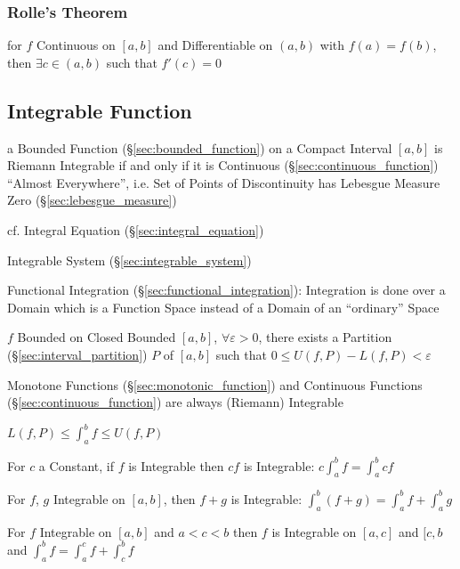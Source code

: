 \subsubsection{Rolle's Theorem}\label{sec:rolles_theorem}

for $f$ Continuous on $[a,b]$ and Differentiable on $(a,b)$ with $f(a)
= f(b)$, then $\exists c \in (a,b)$ such that $f'(c) = 0$



\subsection{Integrable Function}\label{sec:integrable_function}


a Bounded Function (\S\ref{sec:bounded_function}) on a Compact Interval $[a,b]$
is Riemann Integrable if and only if it is Continuous
(\S\ref{sec:continuous_function}) ``Almost Everywhere'', i.e. Set of Points of
Discontinuity has Lebesgue Measure Zero (\S\ref{sec:lebesgue_measure})

cf. Integral Equation (\S\ref{sec:integral_equation})

\fist Integrable System (\S\ref{sec:integrable_system})

\fist Functional Integration (\S\ref{sec:functional_integration}): Integration
is done over a Domain which is a Function Space instead of a Domain of an
``ordinary'' Space

$f$ Bounded on Closed Bounded $[a,b]$, $\forall \varepsilon >0$, there
exists a Partition (\S\ref{sec:interval_partition}) $P$ of $[a,b]$
such that $0 \leq U(f,P) - L(f,P) < \varepsilon$ %

Monotone Functions (\S\ref{sec:monotonic_function}) and Continuous
Functions (\S\ref{sec:continuous_function}) are always (Riemann)
Integrable

$L(f,P) \leq \int_a^b f \leq U(f,P)$

For $c$ a Constant, if $f$ is Integrable then $cf$ is Integrable: $c
\int_a^b f = \int_a^b c f$

For $f$, $g$ Integrable on $[a,b]$, then $f + g$ is Integrable:
$\int_a^b (f+g) = \int_a^b f + \int_a^b g$

For $f$ Integrable on $[a,b]$ and $a < c < b$ then $f$ is Integrable
on $[a,c]$ and $[c,b$ and $\int_a^b f = \int_a^c f + \int_c^b f$

